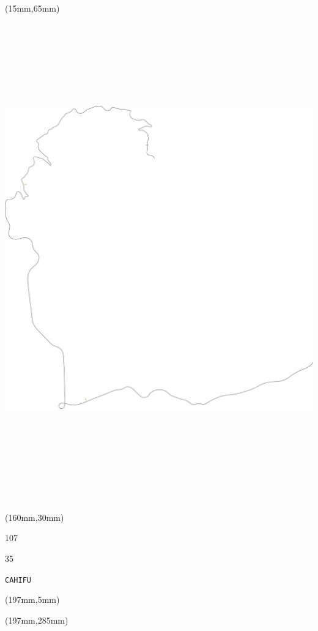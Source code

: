 \begin{textblock*}{185mm}(15mm,65mm)%
\centering
\mbox{\includegraphics[width=185mm,height=210mm,keepaspectratio]{PT/CAHIFU.pdf}}
\end{textblock*}
\begin{textblock*}{40mm}(160mm,30mm)%
\Large
\par{} 
\par107 
\par35 
\par\hfill\tiny\tt CAHIFU\\
\end{textblock*}
\begin{textblock*}{20mm}(197mm,5mm)%
\fbox{\thepage}
\label{CAHIFU}
\end{textblock*}
\begin{textblock*}{20mm}(197mm,285mm)%
\fbox{\thepage}
\end{textblock*}

